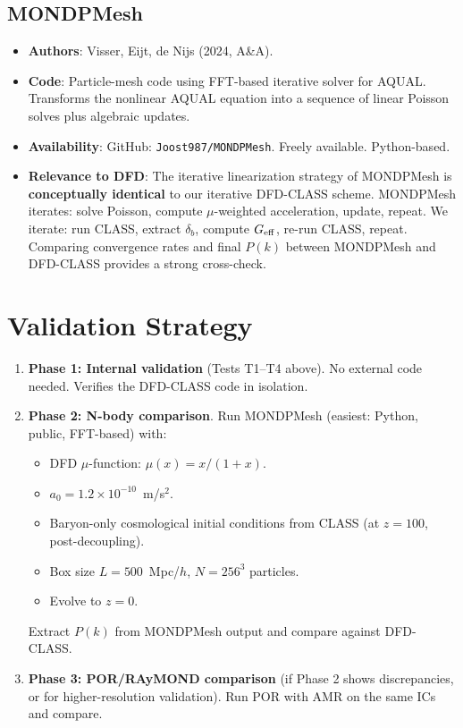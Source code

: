\documentclass[11pt]{article}
\theoremstyle{definition}
\theoremstyle{remark}
\newcommand{\ee}[1]{\times 10^{#1}}
\newcommand{\Geff}{G_{\rm eff}}
\begin{document}
\subsection{MONDPMesh}

\begin{itemize}
\item \textbf{Authors}: Visser, Eijt, de Nijs (2024, A\&A).
\item \textbf{Code}: Particle-mesh code using FFT-based iterative solver
  for AQUAL. Transforms the nonlinear AQUAL equation into a sequence
  of linear Poisson solves plus algebraic updates.
\item \textbf{Availability}: GitHub: \texttt{Joost987/MONDPMesh}.
  Freely available. Python-based.
\item \textbf{Relevance to DFD}: The iterative linearization strategy
  of MONDPMesh is \textbf{conceptually identical} to our iterative
  DFD-CLASS scheme. MONDPMesh iterates: solve Poisson, compute
  $\mu$-weighted acceleration, update, repeat. We iterate: run CLASS,
  extract $\delta_b$, compute $\Geff$, re-run CLASS, repeat.
  Comparing convergence rates and final $P(k)$ between MONDPMesh and
  DFD-CLASS provides a strong cross-check.
\end{itemize}


\section{Validation Strategy}

\begin{enumerate}
\item \textbf{Phase 1: Internal validation} (Tests T1--T4 above).
  No external code needed. Verifies the DFD-CLASS code in isolation.

\item \textbf{Phase 2: N-body comparison}.
  Run MONDPMesh (easiest: Python, public, FFT-based) with:
  \begin{itemize}
  \item DFD $\mu$-function: $\mu(x) = x/(1+x)$.
  \item $a_0 = 1.2\ee{-10}$~m/s$^2$.
  \item Baryon-only cosmological initial conditions from CLASS
    (at $z = 100$, post-decoupling).
  \item Box size $L = 500$~Mpc/$h$, $N = 256^3$ particles.
  \item Evolve to $z = 0$.
  \end{itemize}
  Extract $P(k)$ from MONDPMesh output and compare against DFD-CLASS.

\item \textbf{Phase 3: POR/RAyMOND comparison} (if Phase 2 shows
  discrepancies, or for higher-resolution validation). Run POR with
  AMR on the same ICs and compare.
\end{enumerate}
\end{document}
